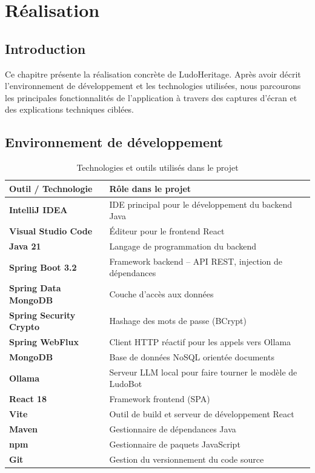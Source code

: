 \chapter{Réalisation}

\section{Introduction}

Ce chapitre présente la réalisation concrète de LudoHeritage. Après avoir décrit l'environnement
de développement et les technologies utilisées, nous parcourons les principales fonctionnalités
de l'application à travers des captures d'écran et des explications techniques ciblées.

\section{Environnement de développement}

\begin{table}[H]
\centering
\renewcommand{\arraystretch}{1.4}
\begin{tabularx}{\textwidth}{>{\bfseries}p{4cm} X}
\toprule
\textbf{Outil / Technologie} & \textbf{Rôle dans le projet} \\
\midrule
IntelliJ IDEA & IDE principal pour le développement du backend Java \\
Visual Studio Code & Éditeur pour le frontend React \\
Java 21 & Langage de programmation du backend \\
Spring Boot 3.2 & Framework backend -- API REST, injection de dépendances \\
Spring Data MongoDB & Couche d'accès aux données \\
Spring Security Crypto & Hashage des mots de passe (BCrypt) \\
Spring WebFlux & Client HTTP réactif pour les appels vers Ollama \\
MongoDB & Base de données NoSQL orientée documents \\
Ollama & Serveur LLM local pour faire tourner le modèle de LudoBot \\
React 18 & Framework frontend (SPA) \\
Vite & Outil de build et serveur de développement React \\
Maven & Gestionnaire de dépendances Java \\
npm & Gestionnaire de paquets JavaScript \\
Git & Gestion du versionnement du code source \\
\bottomrule
\end{tabularx}
\caption{Technologies et outils utilisés dans le projet}
\label{tab:technologies}
\end{table}

